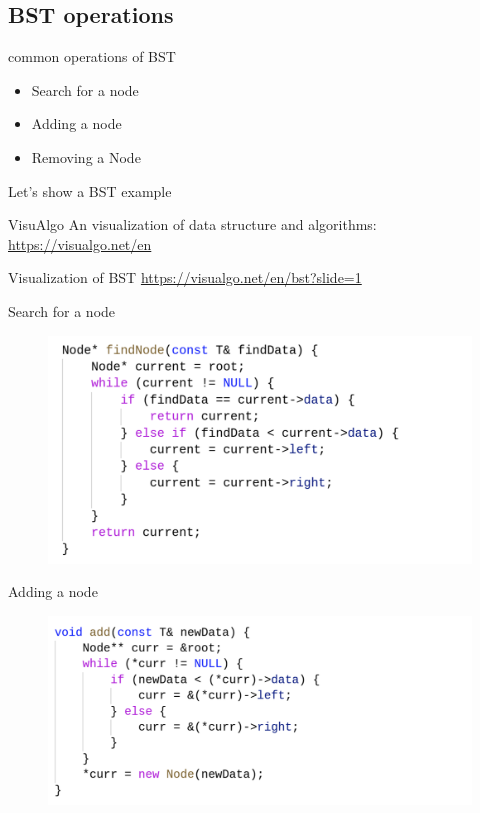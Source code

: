 \documentclass{beamer}
\begin{document}
\subsection{BST operations}
\begin{frame}{common operations of BST}
    \begin{itemize}
        \item Search for a node
        \item Adding a node 
        \item Removing a Node
    \end{itemize}
\end{frame}

\begin{frame}{Let's show a BST example}
    \begin{block}{VisuAlgo}
         An visualization of data structure and algorithms: \url{https://visualgo.net/en}
    \end{block}
    \begin{block}{Visualization of BST}
        \url{https://visualgo.net/en/bst?slide=1}
    \end{block}
\end{frame}

\begin{frame}{Search for a node}
        \begin{figure}
            \includegraphics[width=\textwidth]{BST_find.png}
    \end{figure}
\end{frame}

\begin{frame}{Adding a node}
        \begin{figure}
            \includegraphics[width=\textwidth]{BST_add.png}
    \end{figure}
\end{frame}
\end{document}
